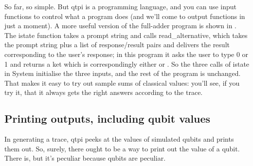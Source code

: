 So far, so simple. But qtpi is a programming language, and you can use input functions to control what a program does (and we'll come to output functions in just a moment). A more useful version of the full-adder program is shown in . The istate function takes a prompt string and calls read\_alternative, which takes the prompt string plus a list of response/result pairs and delivers the result corresponding to the user's response; in this program it asks the user to type 0 or 1 and returns a ket which is correspondingly either \zero{} or \one{}. So the three calls of istate in System initialise the three inputs, and the rest of the program is unchanged. That makes it easy to try out sample sums of classical values: you'll see, if you try it, that it always gets the right answers according to the trace. 

\subsection{Printing outputs, including qubit values}

In generating a trace, qtpi peeks at the values of simulated qubits and prints them out. So, surely, there ought to be a way to print out the value of a qubit. There is, but it's peculiar because qubits are peculiar. 

